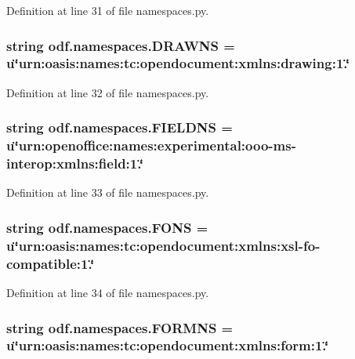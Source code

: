 Definition at line 31 of file namespaces.\+py.

\hypertarget{namespaceodf_1_1namespaces_a1c3d3371868027499fa692523a329771}{
\subsubsection[{D\+R\+A\+W\+N\+S}]{\setlength{\rightskip}{0pt plus 5cm}string odf.\+namespaces.\+D\+R\+A\+W\+N\+S = u\char`\"{}urn\+:oasis\+:names\+:tc\+:opendocument\+:xmlns\+:drawing\+:1.\char`\"{}}}\label{namespaceodf_1_1namespaces_a1c3d3371868027499fa692523a329771}


Definition at line 32 of file namespaces.\+py.

\hypertarget{namespaceodf_1_1namespaces_a5f880ea23cc37a5c2dd018add208fc9a}{
\subsubsection[{F\+I\+E\+L\+D\+N\+S}]{\setlength{\rightskip}{0pt plus 5cm}string odf.\+namespaces.\+F\+I\+E\+L\+D\+N\+S = u\char`\"{}urn\+:openoffice\+:names\+:experimental\+:ooo-\/ms-\/interop\+:xmlns\+:field\+:1.\char`\"{}}}\label{namespaceodf_1_1namespaces_a5f880ea23cc37a5c2dd018add208fc9a}


Definition at line 33 of file namespaces.\+py.

\hypertarget{namespaceodf_1_1namespaces_a2e62823a20c59b5a063f191cb502a40f}{
\subsubsection[{F\+O\+N\+S}]{\setlength{\rightskip}{0pt plus 5cm}string odf.\+namespaces.\+F\+O\+N\+S = u\char`\"{}urn\+:oasis\+:names\+:tc\+:opendocument\+:xmlns\+:xsl-\/fo-\/compatible\+:1.\char`\"{}}}\label{namespaceodf_1_1namespaces_a2e62823a20c59b5a063f191cb502a40f}


Definition at line 34 of file namespaces.\+py.

\hypertarget{namespaceodf_1_1namespaces_a82eec0bd42700b76e98478d5d810c8e6}{
\subsubsection[{F\+O\+R\+M\+N\+S}]{\setlength{\rightskip}{0pt plus 5cm}string odf.\+namespaces.\+F\+O\+R\+M\+N\+S = u\char`\"{}urn\+:oasis\+:names\+:tc\+:opendocument\+:xmlns\+:form\+:1.\char`\"{}}}\label{namespaceodf_1_1namespaces_a82eec0bd42700b76e98478d5d810c8e6}


